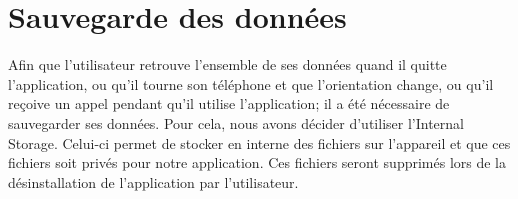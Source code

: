 \documentclass[a4paper,10pt]{article}
\begin{document}
\newpage
\section{Sauvegarde des données}
Afin que l'utilisateur retrouve l'ensemble de ses données quand il quitte l'application, ou qu'il tourne son téléphone et que l'orientation change, ou qu'il reçoive un appel pendant qu'il utilise l'application; il a été nécessaire de sauvegarder ses données. Pour cela, nous avons décider d'utiliser l'Internal Storage. Celui-ci permet de stocker en interne des fichiers sur l'appareil et que ces fichiers soit privés pour notre application. Ces fichiers seront supprimés lors de la désinstallation de l'application par l'utilisateur.
\end{document}
